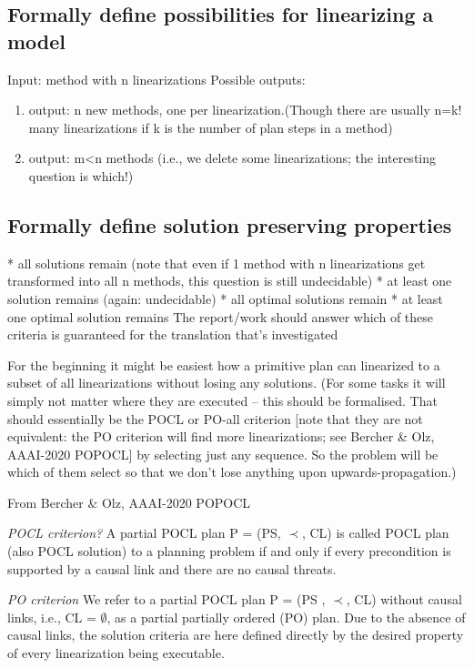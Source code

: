 \subsection{Formally define possibilities for linearizing a model}
Input: method with n linearizations \newline
Possible outputs:
\begin{enumerate}
	\item output: n new methods, one per linearization.(Though there are usually n=k! many linearizations if k is the number of plan steps in a method)
	\item output: m<n methods (i.e., we delete some linearizations; the interesting question is which!) 
\end{enumerate}


\subsection{Formally define solution preserving properties}
* all solutions remain (note that even if 1 method with n linearizations get transformed into all n methods, this question is still undecidable)
* at least one solution remains (again: undecidable)
* all optimal solutions remain
* at least one optimal solution remains
The report/work should answer which of these criteria is guaranteed for the translation that's investigated

 
For the beginning it might be easiest how a primitive plan can linearized to a subset of all linearizations without losing any solutions. (For some tasks it will simply not matter where they are executed -- this should be formalised. That should essentially be the POCL or PO-all criterion [note that they are not equivalent: the PO criterion will find more linearizations; see Bercher \& Olz, AAAI-2020 POPOCL] by selecting just any sequence. So the problem will be which of them select so that we don't lose anything upon upwards-propagation.)


From Bercher \& Olz, AAAI-2020 POPOCL 

\emph{POCL criterion?} A partial POCL plan P = (PS, $\prec$, CL) is called POCL plan (also POCL solution) to a planning problem if and only if every precondition is supported by a causal link and there are no causal threats.


\emph{PO criterion} We refer to a partial POCL plan P = (PS , $\prec$, CL) without causal links, i.e., CL = $\emptyset$, as a partial partially ordered (PO) plan. Due to the absence of causal links, the solution criteria are here defined directly by the desired property of every linearization being executable.


